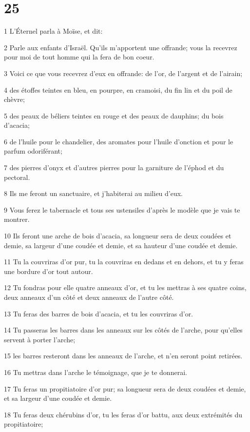 \chapter{25}

\par 1 L'Éternel parla à Moïse, et dit:
\par 2 Parle aux enfants d'Israël. Qu'ils m'apportent une offrande; vous la recevrez pour moi de tout homme qui la fera de bon coeur.
\par 3 Voici ce que vous recevrez d'eux en offrande: de l'or, de l'argent et de l'airain;
\par 4 des étoffes teintes en bleu, en pourpre, en cramoisi, du fin lin et du poil de chèvre;
\par 5 des peaux de béliers teintes en rouge et des peaux de dauphins; du bois d'acacia;
\par 6 de l'huile pour le chandelier, des aromates pour l'huile d'onction et pour le parfum odoriférant;
\par 7 des pierres d'onyx et d'autres pierres pour la garniture de l'éphod et du pectoral.
\par 8 Ils me feront un sanctuaire, et j'habiterai au milieu d'eux.
\par 9 Vous ferez le tabernacle et tous ses ustensiles d'après le modèle que je vais te montrer.
\par 10 Ils feront une arche de bois d'acacia, sa longueur sera de deux coudées et demie, sa largeur d'une coudée et demie, et sa hauteur d'une coudée et demie.
\par 11 Tu la couvriras d'or pur, tu la couvriras en dedans et en dehors, et tu y feras une bordure d'or tout autour.
\par 12 Tu fondras pour elle quatre anneaux d'or, et tu les mettras à ses quatre coins, deux anneaux d'un côté et deux anneaux de l'autre côté.
\par 13 Tu feras des barres de bois d'acacia, et tu les couvriras d'or.
\par 14 Tu passeras les barres dans les anneaux sur les côtés de l'arche, pour qu'elles servent à porter l'arche;
\par 15 les barres resteront dans les anneaux de l'arche, et n'en seront point retirées.
\par 16 Tu mettras dans l'arche le témoignage, que je te donnerai.
\par 17 Tu feras un propitiatoire d'or pur; sa longueur sera de deux coudées et demie, et sa largeur d'une coudée et demie.
\par 18 Tu feras deux chérubins d'or, tu les feras d'or battu, aux deux extrémités du propitiatoire;
